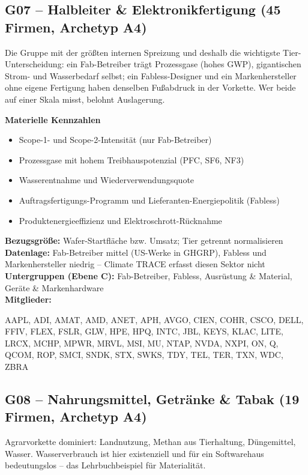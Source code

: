 \medskip
\subsection*{G07 -- Halbleiter \& Elektronikfertigung \normalfont\small (45 Firmen, Archetyp A4)}
\noindent Die Gruppe mit der größten internen Spreizung und deshalb die wichtigste Tier-Unterscheidung: ein Fab-Betreiber trägt Prozessgase (hohes GWP), gigantischen Strom- und Wasserbedarf selbst; ein Fabless-Designer und ein Markenhersteller ohne eigene Fertigung haben denselben Fußabdruck in der Vorkette. Wer beide auf einer Skala misst, belohnt Auslagerung.

\noindent\textbf{Materielle Kennzahlen}
\begin{itemize}[nosep,leftmargin=1.2em]
  \item Scope-1- und Scope-2-Intensität (nur Fab-Betreiber)
  \item Prozessgase mit hohem Treibhauspotenzial (PFC, SF6, NF3)
  \item Wasserentnahme und Wiederverwendungsquote
  \item Auftragsfertigungs-Programm und Lieferanten-Energiepolitik (Fabless)
  \item Produktenergieeffizienz und Elektroschrott-Rücknahme
\end{itemize}
\noindent\textbf{Bezugsgröße:} Wafer-Startfläche bzw. Umsatz; Tier getrennt normalisieren\\
\textbf{Datenlage:} Fab-Betreiber mittel (US-Werke in GHGRP), Fabless und Markenhersteller niedrig -- Climate TRACE erfasst diesen Sektor nicht\\
\textbf{Untergruppen (Ebene C):} Fab-Betreiber, Fabless, Ausrüstung \& Material, Geräte \& Markenhardware\\
\textbf{Mitglieder:} {\raggedright\small\ttfamily AAPL, ADI, AMAT, AMD, ANET, APH, AVGO, CIEN, COHR, CSCO, DELL, FFIV, FLEX, FSLR, GLW, HPE, HPQ, INTC, JBL, KEYS, KLAC, LITE, LRCX, MCHP, MPWR, MRVL, MSI, MU, NTAP, NVDA, NXPI, ON, Q, QCOM, ROP, SMCI, SNDK, STX, SWKS, TDY, TEL, TER, TXN, WDC, ZBRA\par}

\medskip
\subsection*{G08 -- Nahrungsmittel, Getränke \& Tabak \normalfont\small (19 Firmen, Archetyp A4)}
\noindent Agrarvorkette dominiert: Landnutzung, Methan aus Tierhaltung, Düngemittel, Wasser. Wasserverbrauch ist hier existenziell und für ein Softwarehaus bedeutungslos -- das Lehrbuchbeispiel für Materialität.

